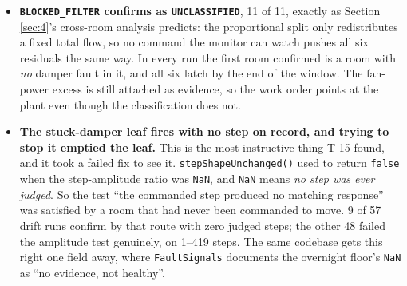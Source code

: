 \begin{itemize}
This report previously called that \emph{a gap in the fault model, not a defect in the classifier},
on the grounds that the classifier's own unit test reaches the branch through a double applying a
constant offset instantaneously, which no ramp can. \textbf{That attribution was tested and it was
wrong.} The generator was given exactly that shape (\texttt{FaultKind.SENSOR\_OFFSET}, injectable
through the unchanged four-field \texttt{FAULT\_SPEC} grammar), and the branch is still unreachable.
The binding constraint is that \textbf{the classification is computed at the confirmation while one
of its inputs needs a day of the fault}, which is a property of when the tree runs. The arithmetic
that closes it: the overnight floor is a minimum over 1440 noisy samples, so it sits about 3.3\,$\sigma$
(very nearly 100 ppm) below the level the room is holding, and the closest any offset came was
a floor of 489 ppm against the 520 ppm the leaf needs, on a case confirmed 1621 min in. An offset
large enough to lift the floor past 520 confirms within three minutes.
\item \textbf{\texttt{BLOCKED\_FILTER} confirms as \texttt{UNCLASSIFIED}}, 11 of 11, exactly as
Section \ref{sec:4}'s cross-room analysis predicts: the proportional split only redistributes a fixed total
flow, so no command the monitor can watch pushes all six residuals the same way. In every run the
first room confirmed is a room with \emph{no} damper fault in it, and all six latch by the end of
the window. The fan-power excess is still attached as evidence, so the work order points at the
plant even though the classification does not.
\item \textbf{The stuck-damper leaf fires with no step on record, and trying to stop it emptied
the leaf.} This is the most instructive thing T-15 found, and it took a failed fix to see it.
\texttt{stepShapeUnchanged()} used to return \texttt{false} when the step-amplitude ratio was
\texttt{NaN}, and \texttt{NaN} means \emph{no step was ever judged}. So the test ``the commanded
step produced no matching response'' was satisfied by a room that had never been commanded to move.
9 of 57 drift runs confirm by that route with zero judged steps; the other 48 failed the amplitude
test genuinely, on 1--419 steps. The same codebase gets this right one field away, where
\texttt{FaultSignals} documents the overnight floor's \texttt{NaN} as ``no evidence, not healthy''.


\end{itemize}
